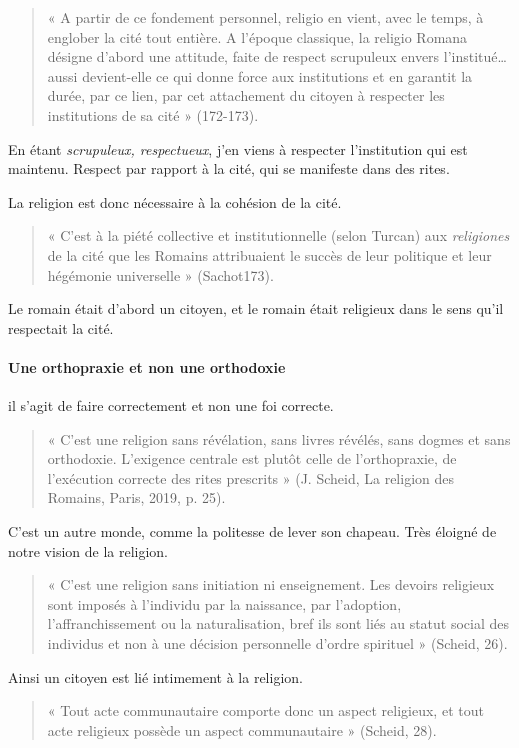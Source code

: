 \begin{quote}
     «  A partir de ce fondement personnel, religio en vient, avec le temps, à englober la cité tout entière. A l’époque classique, la religio Romana désigne d’abord une attitude, faite de respect scrupuleux envers l’institué… aussi devient-elle ce qui donne force aux institutions et en garantit la durée, par ce lien, par cet attachement du citoyen à respecter les institutions de sa cité » (172-173).
\end{quote}

En étant \textit{scrupuleux, respectueux}, j'en viens à respecter l'institution qui est maintenu. Respect par rapport à la cité, qui se manifeste dans des rites. 

La religion est donc nécessaire à la cohésion de la cité. 
\begin{quote}
    « C’est à la piété collective et institutionnelle (selon Turcan) aux \textit{religiones} de la cité que les Romains attribuaient le succès de leur politique et leur hégémonie universelle » (Sachot173). 
\end{quote}
Le romain était d'abord un citoyen, et le romain était religieux dans le sens qu'il respectait la cité.


\paragraph{Une orthopraxie et non une orthodoxie} il s'agit de faire correctement et non une foi correcte.
\begin{quote}
     « C’est une religion sans révélation, sans livres révélés, sans dogmes et sans orthodoxie. L’exigence centrale est plutôt celle de l’orthopraxie, de l’exécution correcte des rites prescrits » (J. Scheid,  La religion des Romains, Paris, 2019, p. 25). 
\end{quote}


C'est un autre monde, comme la politesse de lever son chapeau. Très éloigné de notre vision de la religion.

\begin{quote}
     « C’est une religion sans initiation ni enseignement. Les devoirs religieux sont imposés à l’individu par la naissance, par l’adoption, l’affranchissement ou la naturalisation, bref ils sont liés au statut social des individus et non à une décision personnelle d’ordre spirituel » (Scheid, 26).
\end{quote}

Ainsi un citoyen est lié intimement à la religion. 
\begin{quote}
    « Tout acte communautaire comporte donc un aspect religieux, et tout acte religieux possède un aspect communautaire » (Scheid, 28).
\end{quote}

